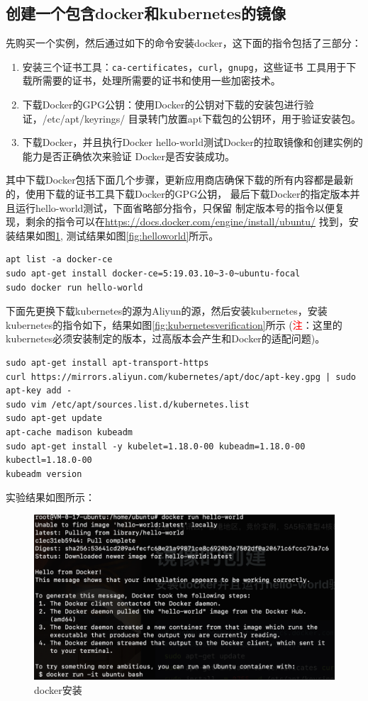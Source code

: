 \documentclass{article}
\begin{document}
\subsection{创建一个包含docker和kubernetes的镜像}
先购买一个实例，然后通过如下的命令安装docker，这下面的指令包括了三部分：
\begin{enumerate}
    \item 安装三个证书工具：\texttt{ca-certificates}，\texttt{curl}，\texttt{gnupg}，这些证书
    工具用于下载所需要的证书，处理所需要的证书和使用一些加密技术。
    \item 下载Docker的GPG公钥：使用Docker的公钥对下载的安装包进行验证，/etc/apt/keyrings/
    目录转门放置apt下载包的公钥环，用于验证安装包。
    \item 下载Docker，并且执行Docker hello-world测试Docker的拉取镜像和创建实例的能力是否正确依次来验证
    Docker是否安装成功。
\end{enumerate}
其中下载Docker包括下面几个步骤，更新应用商店确保下载的所有内容都是最新的，使用下载的证书工具下载Docker的GPG公钥，
最后下载Docker的指定版本并且运行hello-world测试，下面省略部分指令，只保留
制定版本号的指令以便复现，剩余的指令可以在\url{https://docs.docker.com/engine/install/ubuntu/}
找到，安装结果如图\ref{fig:dockerinstall},
测试结果如图\ref{fig:helloworld}所示。
\begin{lstlisting}[style=bashstyle]
apt list -a docker-ce
sudo apt-get install docker-ce=5:19.03.10~3-0~ubuntu-focal
sudo docker run hello-world
\end{lstlisting}
下面先更换下载kubernetes的源为Aliyun的源，然后安装kubernetes，安装kubernetes的指令如下，结果如图\ref{fig:kubernetesverification}所示
(\textcolor{red}{注}：这里的kubernetes必须安装制定的版本，过高版本会产生和Docker的适配问题)。
\begin{lstlisting}[style=bashstyle]
sudo apt-get install apt-transport-https
curl https://mirrors.aliyun.com/kubernetes/apt/doc/apt-key.gpg | sudo apt-key add - 
sudo vim /etc/apt/sources.list.d/kubernetes.list
sudo apt-get update
apt-cache madison kubeadm
sudo apt-get install -y kubelet=1.18.0-00 kubeadm=1.18.0-00 kubectl=1.18.0-00
kubeadm version
\end{lstlisting}
实验结果如图所示： \\
\noindent
\begin{minipage}{0.45\textwidth}
    \begin{figure}[H]
        \includegraphics[width=\textwidth]{dockerhelloworld.png}
        \caption{docker安装}
        \label{fig:dockerinstall}
    \end{figure}
\end{minipage}
\end{document}

